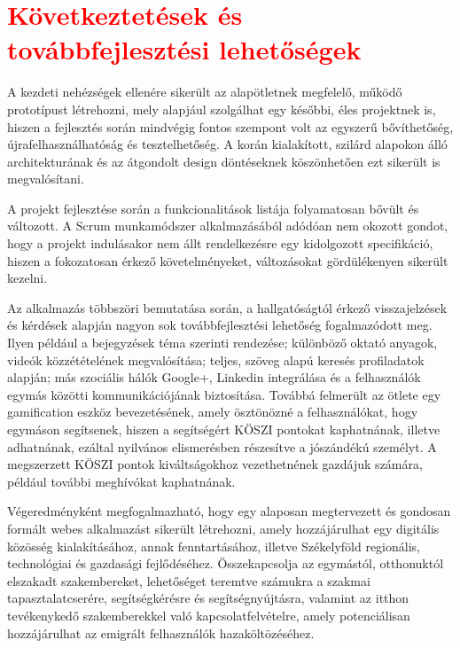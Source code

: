 \chapter{\textcolor{red}{Következtetések és továbbfejlesztési lehetőségek}}
\label{ch:kovetkeztetes}

A kezdeti nehézségek ellenére sikerült az alapötletnek megfelelő, működő prototípust létrehozni, mely alapjául szolgálhat egy későbbi, éles projektnek is, hiszen a fejlesztés során mindvégig fontos szempont volt az egyszerű bővíthetőség, újrafelhasználhatóság és tesztelhetőség.  A korán kialakított, szilárd alapokon álló architekturának és az átgondolt design döntéseknek köszönhetően ezt sikerült is megvalósítani. 

A projekt fejlesztése során a funkcionalitások listája folyamatosan bővült és változott. A Scrum munkamódszer alkalmazásából adódóan nem okozott gondot, hogy a projekt indulásakor nem állt rendelkezésre egy kidolgozott specifikáció, hiszen a fokozatosan érkező követelményeket, változásokat gördülékenyen sikerült kezelni. 

Az alkalmazás többszöri bemutatása során, a hallgatóságtól érkező visszajelzések és kérdések alapján nagyon sok továbbfejlesztési lehetőség fogalmazódott meg. Ilyen például a bejegyzések téma szerinti rendezése; különböző oktató anyagok, videók közzétételének megvalósítása; teljes, szöveg alapú keresés profiladatok alapján; más szociális hálók Google+, Linkedin integrálása és a felhasználók egymás közötti kommunikációjának biztosítása. Továbbá felmerült az ötlete egy gamification eszköz bevezetésének, amely ösztönözné a felhasználókat, hogy egymáson segítsenek, hiszen a segítségért KÖSZI pontokat kaphatnának, illetve adhatnának, ezáltal nyilvános elismerésben részesítve a jószándékú személyt. A megszerzett KÖSZI pontok kiváltságokhoz vezethetnének gazdájuk számára, például további meghívókat kaphatnának. 

Végeredményként megfogalmazható, hogy egy alaposan megtervezett és gondosan formált webes alkalmazást sikerült létrehozni, amely hozzájárulhat egy digitális közösség kialakításához, annak fenntartásához, illetve Székelyföld regionális, technológiai és gazdasági fejlődéséhez. Összekapcsolja az egymástól, otthonuktól elszakadt szakembereket, lehetőséget teremtve számukra a szakmai tapasztalatcserére, segítségkérésre és segítségnyújtásra, valamint az itthon tevékenykedő szakemberekkel való kapcsolatfelvételre, amely potenciálisan hozzájárulhat az emigrált felhasználók hazaköltözéséhez. 
